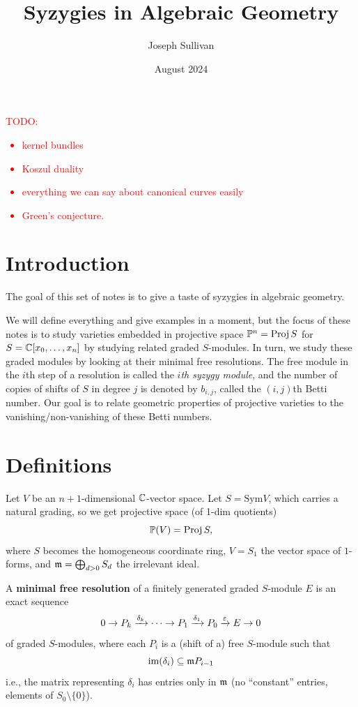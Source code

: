 \documentclass[12pt]{article}
\title{Syzygies in Algebraic Geometry}
\author{Joseph Sullivan}
\date{August 2024}
\newcommand{\Sym}{\mathrm{Sym}}
\begin{document}
\maketitle

\tableofcontents

\textcolor{red}{TODO:
\begin{itemize}
    \item kernel bundles
    \item Koszul duality
    \item everything we can say about canonical curves easily
    \item Green's conjecture.
\end{itemize}
}

\section{Introduction}

The goal of this set of notes is to give a taste of syzygies in algebraic geometry.

We will define everything and give examples in a moment, but the focus of these notes is to study varieties embedded in projective space $\mathbb{P}^n = \operatorname{Proj} S$ for $S=\mathbb{C}[x_0,\dots,x_n]$ by studying related graded $S$-modules. In turn, we study these graded modules by looking at their minimal free resolutions. The free module in the $i$th step of a resolution is called the \textit{$i$th syzygy module}, and the number of copies of shifts of $S$ in degree $j$ is denoted by $b_{i,j}$, called the $(i,j)$th Betti number. Our goal is to relate geometric properties of projective varieties to the vanishing/non-vanishing of these Betti numbers.

\section{Definitions}

Let $V$ be an $n+1$-dimensional $\mathbb{C}$-vector space. Let $S=\Sym V$, which carries a natural grading, so we get projective space (of 1-dim quotients)
\[\mathbb{P}(V) = \operatorname{Proj} S,\]
where $S$ becomes the homogeneous coordinate ring, $V=S_1$ the vector space of $1$-forms, and $\mathfrak{m} = \bigoplus_{d>0} S_d$ the irrelevant ideal.

\begin{defn}
    A \textbf{minimal free resolution} of a finitely generated graded $S$-module $E$ is an exact sequence
    \[0\to P_k \xrightarrow{\delta_k} \cdots \to P_1 \xrightarrow{\delta_1} P_0 \xrightarrow{\varepsilon} E \to 0\]
    of graded $S$-modules, where each $P_i$ is a (shift of a) free $S$-module such that
    \[\mathrm{im}(\delta_i)\subseteq \mathfrak{m} P_{i-1}\]
    i.e., the matrix representing $\delta_i$ has entries only in $\mathfrak{m}$ (no ``constant'' entries, elements of $S_0\setminus \{0\}$).
\end{defn}
\end{document}
